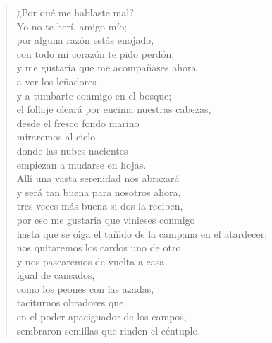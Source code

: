 \documentclass[11pt]{book}
\newcommand*{\centeredornament}{\centerline{\pgfornament[width=6cm]{88}}}
\begin{document}
\begin{verse}
  ¿Por qué me hablaste mal? \\
  Yo no te herí, amigo mío; \\
  por alguna razón estás enojado, \\
  con todo mi corazón te pido perdón, \\
  y me gustaría que me acompañases ahora \\
  a ver los leñadores \\
  y a tumbarte conmigo en el bosque; \\
  el follaje oleará por encima nuestras cabezas, \\
  desde el fresco fondo marino \\
  miraremos al cielo \\
  donde las nubes nacientes \\
  empiezan a mudarse en hojas. \\
  Allí una vasta serenidad nos abrazará \\
  y será tan buena para nosotros ahora, \\
  tres veces más buena si dos la reciben, \\
  por eso me gustaría que vinieses conmigo \\
  hasta que se oiga el tañido de la campana en el atardecer; \\
  nos quitaremos los cardos uno de otro \\
  y nos pasearemos de vuelta a casa, \\
  igual de cansados, \\
  como los peones con las azadas, \\
  taciturnos obradores que, \\
  en el poder apaciguador de los campos, \\
  sembraron semillas que rinden el céntuplo.
\end{verse}

\newpage

\vspace*{-15mm}
\centeredornament


\end{document}

